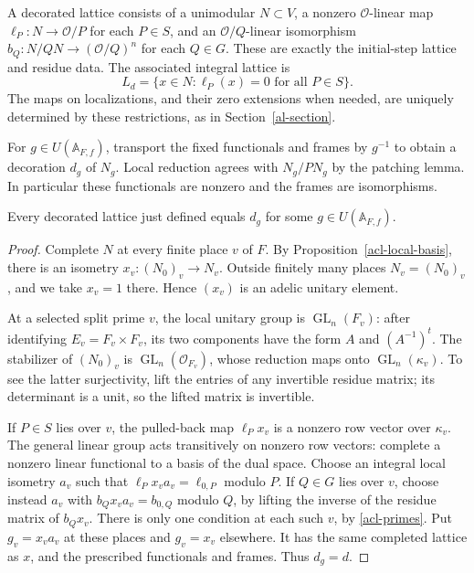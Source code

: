 A decorated lattice consists of a unimodular $N\subset V$, a
nonzero $\mathcal O$-linear map $\ell_P:N\to\mathcal O/P$ for each $P\in S$,
and an $\mathcal O/Q$-linear isomorphism
$b_Q:N/QN\to(\mathcal O/Q)^n$ for each
$Q\in G$. These are exactly the initial-step lattice and residue
data. The associated integral lattice is
\begin{equation}\label{acl-kernel}
                      L_d=\{x\in N:\ell_P(x)=0\text{ for all }P\in S\}.
\end{equation}
The maps on localizations, and their zero extensions when needed,
are uniquely determined by these restrictions, as in
Section~\ref{al-section}.

For $g\in U(\mathbb A_{F,f})$, transport the fixed functionals
and frames by $g^{-1}$ to obtain a decoration $d_g$ of $N_g$.
Local reduction agrees with $N_g/PN_g$ by the patching lemma.
In particular these functionals are nonzero and the frames are
isomorphisms.

\begin{theorem}
\label{acl-points}
Every decorated lattice just defined equals $d_g$ for some
$g\in U(\mathbb A_{F,f})$.
\end{theorem}
\begin{proof}
Complete $N$ at every finite place $v$ of $F$. By
Proposition~\ref{acl-local-basis}, there is an isometry
$x_v:(N_0)_v\to N_v$. Outside finitely many places $N_v=(N_0)_v$,
and we take $x_v=1$ there. Hence $(x_v)$ is an adelic unitary
element.

At a selected split prime $v$, the local unitary group is
$\operatorname{GL}_n(F_v)$: after identifying
$E_v=F_v\times F_v$, its two components have the form
$A$ and $(A^{-1})^t$. The stabilizer of $(N_0)_v$ is
$\operatorname{GL}_n(\mathcal O_{F_v})$, whose reduction maps
onto $\operatorname{GL}_n(\kappa_v)$. To see the latter
surjectivity, lift the entries of any invertible residue matrix;
its determinant is a unit, so the lifted matrix is invertible.

If $P\in S$ lies over $v$, the pulled-back map $\ell_Px_v$
is a nonzero row vector over $\kappa_v$. The general linear
group acts transitively on nonzero row vectors: complete a
nonzero linear functional to a basis of the dual space.
Choose an integral local isometry $a_v$ such that
$\ell_Px_va_v=\ell_{0,P}$ modulo $P$.
If $Q\in G$ lies over $v$, choose instead $a_v$ with
$b_Qx_va_v=b_{0,Q}$ modulo $Q$, by lifting the inverse of
the residue matrix of $b_Qx_v$.
There is only one condition at each such $v$, by
\eqref{acl-primes}. Put $g_v=x_va_v$ at these places and
$g_v=x_v$ elsewhere. It has the same completed lattice as $x$,
and the prescribed functionals and frames. Thus $d_g=d$.
\end{proof}


